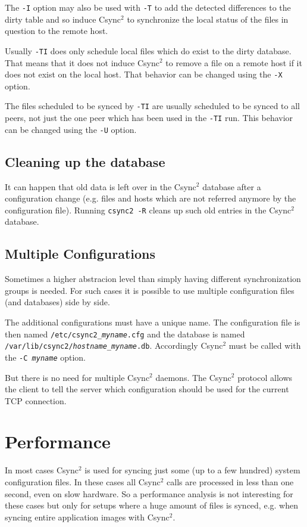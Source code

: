 \documentclass[a4paper,twocolumn]{article}
\def\csync2{{\sc Csync$^{2}$}}
\begin{document}
The {\tt -I} option may also be used with {\tt -T} to add the detected
differences to the dirty table and so induce \csync2 to synchronize the local
status of the files in question to the remote host.

Usually {\tt -TI} does only schedule local files which do exist to the dirty
database. That means that it does not induce \csync2 to remove a file on a
remote host if it does not exist on the local host. That behavior can be
changed using the {\tt -X} option.

The files scheduled to be synced by {\tt -TI} are usually scheduled to be
synced to all peers, not just the one peer which has been used in the {\tt -TI}
run. This behavior can be changed using the {\tt -U} option.

\subsection{Cleaning up the database}

It can happen that old data is left over in the \csync2 database after a
configuration change (e.g. files and hosts which are not referred anymore
by the configuration file). Running {\tt csync2 -R} cleans up such old
entries in the \csync2 database.

\subsection{Multiple Configurations}

Sometimes a higher abstracion level than simply having different
synchronization groups is needed. For such cases it is possible to use multiple
configuration files (and databases) side by side.

The additional configurations must have a unique name. The configuration file
is then named {\tt /etc/csync2\_{\it myname}.cfg} and the database is named
{\tt /var/lib/csync2/{\it hostname}\_{\it myname}.db}. Accordingly \csync2 must
be called with the {\tt -C {\it myname}} option.

But there is no need for multiple \csync2 daemons. The \csync2 protocol allows
the client to tell the server which configuration should be used for the
current TCP connection.

\section{Performance}

In most cases \csync2 is used for syncing just some (up to a few hundred) system
configuration files. In these cases all \csync2 calls are processed in less than
one second, even on slow hardware. So a performance analysis is not interesting
for these cases but only for setups where a huge amount of files is synced,
e.g. when syncing entire application images with \csync2.
\end{document}
